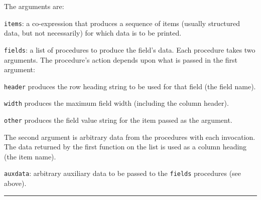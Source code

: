 



The arguments are:

\texttt{items}: a co-expression that produces a sequence of items
(usually structured data, but not necessarily) for which data
is to be printed.

\texttt{fields}: a list of procedures to produce the
field's data. Each procedure takes two arguments. The
procedure's action depends upon what is passed in the
first argument:

\texttt{header} produces the row heading string to be used for that
field (the field name).

\texttt{width} produces the maximum field width (including the column
header).

\texttt{other} produces the field value string for the item passed as
the argument.

The second argument is arbitrary data from the procedures with each
invocation. The data returned by the first function on the list is used
as a column heading (the item name).

\texttt{auxdata}: arbitrary auxiliary data to be passed to the \texttt{fields}
procedures (see above).

\vspace{0.25cm}\hrule{}

